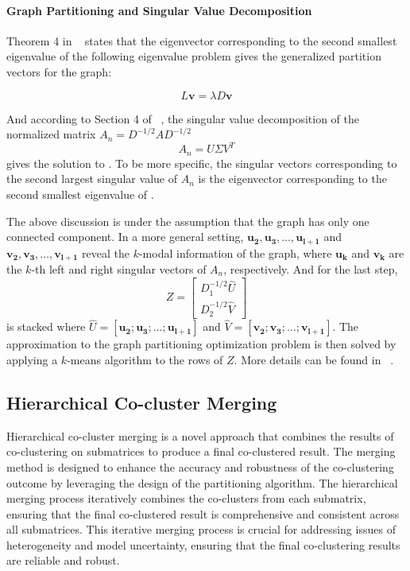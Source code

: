 \documentclass[journal]{IEEEtran}
\renewcommand{\cite}[1]{~\autocite{#1}}
\begin{document}
\paragraph{Graph Partitioning and Singular Value Decomposition}
Theorem 4 in \cite{dhillon2001CoclusteringDocumentsWords} states that the eigenvector corresponding to the second smallest eigenvalue of the following eigenvalue problem gives the generalized partition vectors for the graph:

\begin{equation}
  L \mathbf{v} = \lambda D \mathbf{v}
  \label{eq:eigenvalue_problem}
\end{equation}

And according to Section 4 of \cite{dhillon2001CoclusteringDocumentsWords}, the singular value decomposition of the normalized matrix $A_n = D^{-1/2} A D^{-1/2}$
$$A_n = U \Sigma V^T$$
gives the solution to . To be more specific, the singular vectors corresponding to the second largest singular value of $A_n$ is the eigenvector corresponding to the second smallest eigenvalue of .

The above discussion is under the assumption that the graph has only one connected component. In a more general setting, $\mathbf{u_2}, \mathbf{u_3}, \ldots, \mathbf{u_{l+1}}$ and $\mathbf{v_2}, \mathbf{v_3}, \ldots, \mathbf{v_{l+1}}$ reveal the $k$-modal information of the graph, where $\mathbf{u_k}$ and $\mathbf{v_k}$ are the $k$-th left and right singular vectors of $A_n$, respectively.
And for the last step,
$$ Z = \begin{bmatrix} D_1^{-1/2} \hat{U} \\ D_2^{-1/2} \hat{V} \end{bmatrix} $$
is stacked where $\hat{U} = [\mathbf{u_2}; \mathbf{u_3}; \ldots; \mathbf{u_{l+1}}]$ and $\hat{V} = [\mathbf{v_2}; \mathbf{v_3}; \ldots; \mathbf{v_{l+1}}]$. The approximation to the graph partitioning optimization problem is then solved by applying a $k$-means algorithm to the rows of $Z$. More details can be found in \cite{dhillon2001CoclusteringDocumentsWords}.

\subsection{Hierarchical Co-cluster Merging}


Hierarchical co-cluster merging is a novel approach that combines the results of co-clustering on submatrices to produce a final co-clustered result.
The merging method is designed to enhance the accuracy and robustness of the co-clustering outcome by leveraging the design of the partitioning algorithm. The hierarchical merging process iteratively combines the co-clusters from each submatrix, ensuring that the final co-clustered result is comprehensive and consistent across all submatrices. This iterative merging process is crucial for addressing issues of heterogeneity and model uncertainty, ensuring that the final co-clustering results are reliable and robust.
\end{document}
